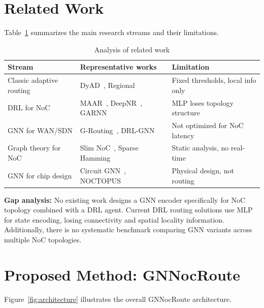 \documentclass[conference]{IEEEtran}
\begin{document}
\section{Related Work}
\label{sec:related}

Table~\ref{tab:related} summarizes the main research streams and their limitations.

\begin{table}[h]
\centering
\caption{Analysis of related work}
\label{tab:related}
\small
\begin{tabular}{p{2.8cm}p{3cm}p{3.2cm}}
\toprule
\textbf{Stream} & \textbf{Representative works} & \textbf{Limitation} \\
\midrule
Classic adaptive routing & DyAD~\cite{dyad2004}, Regional~\cite{ebrahimi2019} & Fixed thresholds, local info only \\
DRL for NoC & MAAR~\cite{wang2022maar}, DeepNR~\cite{deepnr2022}, GARNN~\cite{garnn2023} & MLP loses topology structure \\
GNN for WAN/SDN & G-Routing~\cite{g-routing2023}, DRL-GNN~\cite{drl-gnn2019} & Not optimized for NoC latency \\
Graph theory for NoC & Slim NoC~\cite{slimnoc2018}, Sparse Hamming~\cite{sparsehamming2023} & Static analysis, no real-time \\
GNN for chip design & Circuit GNN~\cite{mirhoseini2021}, NOCTOPUS~\cite{noctopus2026} & Physical design, not routing \\
\bottomrule
\end{tabular}
\end{table}

\textbf{Gap analysis:} No existing work designs a GNN encoder specifically for NoC topology combined with a DRL agent. Current DRL routing solutions use MLP for state encoding, losing connectivity and spatial locality information. Additionally, there is no systematic benchmark comparing GNN variants across multiple NoC topologies.

\section{Proposed Method: GNNocRoute}
\label{sec:method}

Figure~\ref{fig:architecture} illustrates the overall GNNocRoute architecture.
\end{document}
